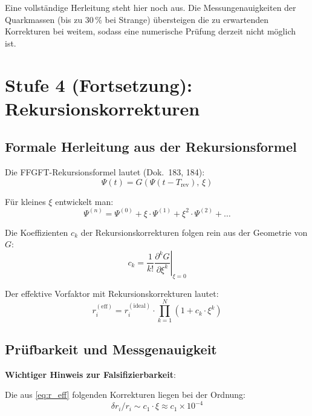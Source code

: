 Eine vollständige Herleitung steht hier noch aus. Die Messungenauigkeiten
der Quarkmassen (bis zu 30\,\% bei Strange) übersteigen die zu
erwartenden Korrekturen bei weitem, sodass eine numerische Prüfung
derzeit nicht möglich ist.

\section{Stufe 4 (Fortsetzung): Rekursionskorrekturen}

\subsection{Formale Herleitung aus der Rekursionsformel}

Die FFGFT-Rekursionsformel lautet (Dok.~183, 184):
\begin{equation}
    \Psi(t) = G\!\left(\Psi(t - T_{\mathrm{rev}}),\, \xi\right)
    \label{eq:recursion}
\end{equation}

Für kleines $\xi$ entwickelt man:
\begin{equation}
    \Psi^{(n)} = \Psi^{(0)}
    + \xi \cdot \Psi^{(1)}
    + \xi^2 \cdot \Psi^{(2)}
    + \ldots
\end{equation}

Die Koeffizienten $c_k$ der Rekursionskorrekturen folgen rein
aus der Geometrie von $G$:
\begin{equation}
    c_k = \frac{1}{k!}
    \left.\frac{\partial^k G}{\partial \xi^k}\right|_{\xi=0}
    \label{eq:ck}
\end{equation}

Der effektive Vorfaktor mit Rekursionskorrekturen lautet:
\begin{equation}
    r_i^{(\mathrm{eff})} = r_i^{(\mathrm{ideal})}
    \cdot \prod_{k=1}^{N} \left(1 + c_k \cdot \xi^k\right)
    \label{eq:r_eff}
\end{equation}

\subsection{Prüfbarkeit und Messgenauigkeit}

\textbf{Wichtiger Hinweis zur Falsifizierbarkeit}:

Die aus \eqref{eq:r_eff} folgenden Korrekturen liegen bei der Ordnung:
\begin{equation}
    \delta r_i / r_i \sim c_1 \cdot \xi \approx c_1 \times 10^{-4}
\end{equation}

